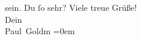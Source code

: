 \begin{ledgroupsized}[t]{13cm}
{{{                  sein.}}}\label{K_L03372-9h} Du ſo sehr?\pend
           \pstart
           Viele treue Grüße! {\\[\baselineskip]}Dein {\\[\baselineskip]}\spacefill\mbox{Paul Goldm}\pend
           \leftskip=0em{}
         
         \endnumbering{}\end{ledgroupsized}  \newcommand{\dateiname}{L03372}\newcommand{\titel}{Paul Goldmann an Arthur Schnitzler, 13. 5. [1903]}\newcommand{\editorInnen}{Martin Anton Müller und Laura Untner}
      